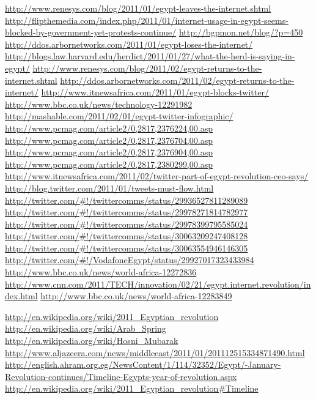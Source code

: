 \url{http://www.renesys.com/blog/2011/01/egypt-leaves-the-internet.shtml}
\url{http://flipthemedia.com/index.php/2011/01/internet-usage-in-egypt-seems-blocked-by-government-yet-protests-continue/}
\url{http://bgpmon.net/blog/?p=450}
\url{http://ddos.arbornetworks.com/2011/01/egypt-loses-the-internet/}
\url{http://blogs.law.harvard.edu/herdict/2011/01/27/what-the-herd-is-saying-in-egypt/}
\url{http://www.renesys.com/blog/2011/02/egypt-returns-to-the-internet.shtml}
\url{http://ddos.arbornetworks.com/2011/02/egypt-returns-to-the-internet/}
%
\url{http://www.itnewsafrica.com/2011/01/egypt-blocks-twitter/}
\url{http://www.bbc.co.uk/news/technology-12291982}
\url{http://mashable.com/2011/02/01/egypt-twitter-infographic/}
\url{http://www.pcmag.com/article2/0,2817,2376224,00.asp}
\url{http://www.pcmag.com/article2/0,2817,2376704,00.asp}
\url{http://www.pcmag.com/article2/0,2817,2376904,00.asp}
\url{http://www.pcmag.com/article2/0,2817,2380299,00.asp}
\url{http://www.itnewsafrica.com/2011/02/twitter-part-of-egypt-revolution-ceo-says/}
\url{http://blog.twitter.com/2011/01/tweets-must-flow.html}
%
\url{http://twitter.com/#!/twittercomms/status/29936527811289089}
\url{http://twitter.com/#!/twittercomms/status/29978271814782977}
\url{http://twitter.com/#!/twittercomms/status/29978399795585024}
\url{http://twitter.com/#!/twittercomms/status/30063209247408128}
\url{http://twitter.com/#!/twittercomms/status/30063554946146305}
\url{http://twitter.com/#!/VodafoneEgypt/status/29927017323433984}
%
\url{http://www.bbc.co.uk/news/world-africa-12272836}
\url{http://www.cnn.com/2011/TECH/innovation/02/21/egypt.internet.revolution/index.html}
\url{http://www.bbc.co.uk/news/world-africa-12283849}

\url{http://en.wikipedia.org/wiki/2011_Egyptian_revolution}
\url{http://en.wikipedia.org/wiki/Arab_Spring}
\url{http://en.wikipedia.org/wiki/Hosni_Mubarak}
\url{http://www.aljazeera.com/news/middleeast/2011/01/201112515334871490.html}
\url{http://english.ahram.org.eg/NewsContent/1/114/32352/Egypt/-January-Revolution-continues/Timeline-Egypts-year-of-revolution.aspx}
\url{http://en.wikipedia.org/wiki/2011_Egyptian_revolution#Timeline}


